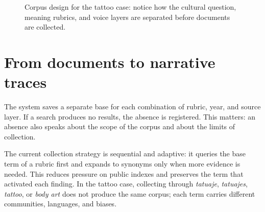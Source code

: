 \documentclass[11pt]{article}
\begin{document}
\begin{figure}[H]
\centering
{}
\caption{Corpus design for the tattoo case: notice how the cultural question, meaning rubrics, and voice layers are separated before documents are collected.}
\label{fig:tattoo-corpus-en}
\end{figure}

\section{From documents to narrative traces}

The system saves a separate base for each combination of rubric, year, and
source layer. If a search produces no results, the absence is registered. This
matters: an absence also speaks about the scope of the corpus and about the
limits of collection.

The current collection strategy is sequential and adaptive: it queries the base
term of a rubric first and expands to synonyms only when more evidence is
needed. This reduces pressure on public indexes and preserves the term that
activated each finding. In the tattoo case, collecting through \textit{tatuaje},
\textit{tatuajes}, \textit{tattoo}, or \textit{body art} does not produce the
same corpus; each term carries different communities, languages, and biases.
\end{document}
